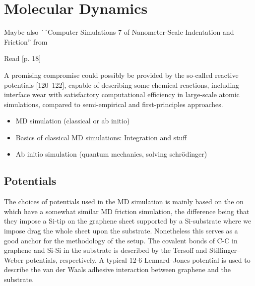 \section{Molecular Dynamics}


Maybe also ´´Computer Simulations 7 of Nanometer-Scale Indentation
and Friction'' from \cite{BHUSHAN20051507}

Read \cite{Manini_2016}[p. 18]

A promising compromise could possibly be provided by the so-called reactive potentials [120–122], capable of describing some chemical reactions, including interface wear with satisfactory computational efficiency in large-scale atomic simulations, compared to semi-empirical and first-principles approaches. \cite{Manini_2016}




\begin{itemize}
  \item MD simulation (classical or ab initio)
  \item Basics of classical MD simulations: Integration and stuff
  \item Ab initio simulation (quantum mechanics, solving schrödinger)
\end{itemize}





\subsection{Potentials}

The choices of potentials used in the MD simulation is mainly based on the on
\cite{li_evolving_2016} which have a somewhat similar MD friction simulation,
the difference being that they impose a Si-tip on the graphene sheet supported
by a Si-substrate where we impose drag the whole sheet upon the substrate.
Nonetheless this serves as a good anchor for the methodology of the setup. The
covalent bonds of C-C in graphene and Si-Si in the substrate is described by the
Tersoff and Stillinger–Weber potentials, respectively. A typical 12-6
Lennard–Jones potential is used to describe the van der Waals adhesive
interaction between graphene and the substrate. \\

